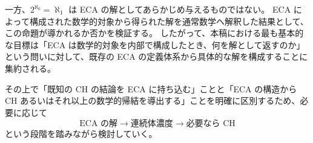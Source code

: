 \documentclass[a4paper,11pt]{article}
\begin{document}
一方、$2^{\aleph_0}=\aleph_1$ は ECA の解としてあらかじめ与えるものではない。
ECA によって構成された数学的対象から得られた解を通常数学へ解釈した結果として、この命題が導かれるか否かを検証する。
したがって、本稿における最も基本的な目標は「ECA は数学的対象を内部で構成したとき、何を解として返すのか」という問いに対して、既存の ECA の定義体系から具体的な解を構成することに集約される。

その上で「既知の CH の結論を ECA に持ち込む」ことと「ECA の構造から CH あるいはそれ以上の数学的帰結を導出する」ことを明確に区別するため、必要に応じて
\[
\boxed{
\text{ECA の解}
\longrightarrow
\text{連続体濃度}
\longrightarrow
\text{必要なら CH}
}
\]
という段階を踏みながら検討していく。
\end{document}
